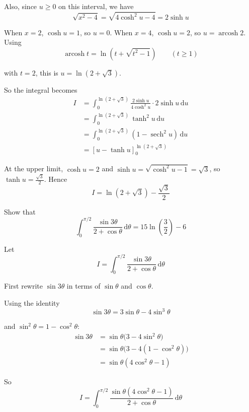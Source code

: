 \documentclass[leqno]{article}
\begin{document}
\begin{enumerate}[
  label=\textbf{\arabic*.},
  leftmargin=*,
  topsep=0pt,
  partopsep=0pt,
  parsep=0pt
]
\begin{djsSolution}
Also, since \(u\ge0\) on this interval, we have
\[
\sqrt{x^2-4}=\sqrt{4\cosh^2u-4}=2\sinh u
\]

When \(x=2\), \(\cosh u=1\), so \(u=0\). When \(x=4\), \(\cosh u=2\), so \(u=\operatorname{arcosh}2\). Using
\[
\operatorname{arcosh} t=\ln\left(t+\sqrt{t^2-1}\right)\qquad (t\ge 1)
\]

with \(t=2\), this is \(u=\ln\left(2+\sqrt{3}\right)\).

So the integral becomes
\begin{align*}
I
&=\int_0^{\ln(2+\sqrt{3})} \frac{2\sinh u}{4\cosh^2u}\cdot 2\sinh u\,\mathrm{d}u \\
&=\int_0^{\ln(2+\sqrt{3})} \tanh^2u\,\mathrm{d}u \\
&=\int_0^{\ln(2+\sqrt{3})} \left(1-\operatorname{sech}^2u\right)\,\mathrm{d}u \\
&=\left[u-\tanh u\right]_0^{\ln(2+\sqrt{3})}
\end{align*}

At the upper limit, \(\cosh u=2\) and \(\sinh u=\sqrt{\cosh^2u-1}=\sqrt{3}\), so \(\tanh u=\frac{\sqrt{3}}{2}\). Hence
\[
I=\ln\left(2+\sqrt{3}\right)-\frac{\sqrt{3}}{2}
\]
\end{djsSolution}


\newpage

\questionitem

Show that
\[
\int_0^{\pi/2} \frac{\sin 3\theta}{2 + \cos \theta}\,\mathrm{d}\theta = 15\ln\left(\frac{3}{2}\right) - 6
\]

\vspace*{10pt}

\begin{djsSolution}
Let
\[
I=\int_0^{\pi/2}\frac{\sin 3\theta}{2+\cos\theta}\,\mathrm{d}\theta
\]

First rewrite $\sin 3\theta$ in terms of $\sin\theta$ and $\cos\theta$.

Using the identity
\[
\sin 3\theta=3\sin\theta-4\sin^3\theta
\]

and $\sin^2\theta=1-\cos^2\theta$:
\begin{align*}
\sin 3\theta
&=\sin\theta\bigl(3-4\sin^2\theta\bigr)\\
&=\sin\theta\bigl(3-4(1-\cos^2\theta)\bigr)\\
&=\sin\theta(4\cos^2\theta-1)
\end{align*}

So
\[
I=\int_0^{\pi/2}\frac{\sin\theta(4\cos^2\theta-1)}{2+\cos\theta}\,\mathrm{d}\theta
\]


\end{djsSolution}
\end{enumerate}
\end{document}
